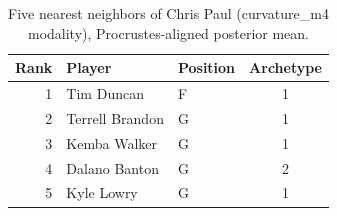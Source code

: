 \begin{table}[htbp]
  \centering\small
  \begin{tabular}{rllc}
    \toprule
    Rank & Player & Position & Archetype \\
    \midrule
    1 & Tim Duncan & F & 1 \\
    2 & Terrell Brandon & G & 1 \\
    3 & Kemba Walker & G & 1 \\
    4 & Dalano Banton & G & 2 \\
    5 & Kyle Lowry & G & 1 \\
    \bottomrule
  \end{tabular}
  \caption{Five nearest neighbors of Chris Paul (curvature_m4 modality), Procrustes-aligned posterior mean.}
  \label{tab:Chris_Paul_neighbors_curvature_m4}
\end{table}


